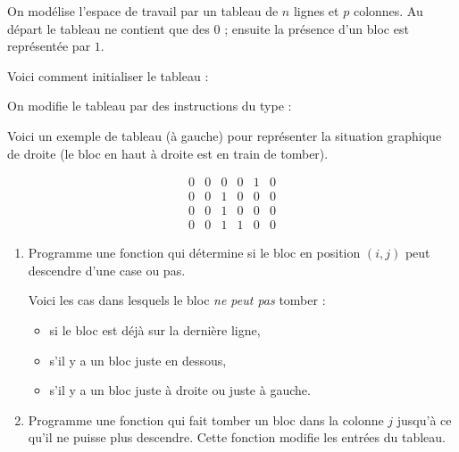 \documentclass[11pt,class=report,crop=false]{standalone}
\begin{document}
\begin{activite}


On modélise l'espace de travail par un tableau de $n$ lignes et $p$ colonnes. Au départ le tableau ne contient que des $0$ ;
 ensuite la présence d'un bloc est représentée par $1$.

Voici comment initialiser le tableau :\\
\centerline{}
On modifie le tableau par des instructions du type :\\
\centerline{}


Voici un exemple de tableau (à gauche) pour représenter la situation graphique de droite (le bloc en haut à droite est en train de tomber).

\begin{center}
\begin{minipage}{0.3\textwidth}
$$\begin{array}{cccccc}
0&0&0&0&1&0\\
0&0&1&0&0&0\\
0&0&1&0&0&0\\
0&0&1&1&0&0
\end{array}$$
\end{minipage}
\begin{minipage}{0.4\textwidth}
\end{minipage}
\end{center}

\begin{enumerate}
  \item Programme une fonction  qui détermine si le bloc en position $(i,j)$ peut descendre d'une case ou pas.
  
  Voici les cas dans lesquels le bloc \emph{ne peut pas} tomber :
  \begin{itemize}
    \item si le bloc est déjà sur la dernière ligne,
    \item s'il y a un bloc juste en dessous,
    \item s'il y a un bloc juste à droite ou juste à gauche.
  \end{itemize}
  
  \item Programme une fonction 
qui fait tomber un bloc dans la colonne $j$ jusqu'à ce qu'il ne puisse plus descendre.
Cette fonction modifie les entrées du tableau.  
  

\end{enumerate}
\end{activite}
\end{document}
